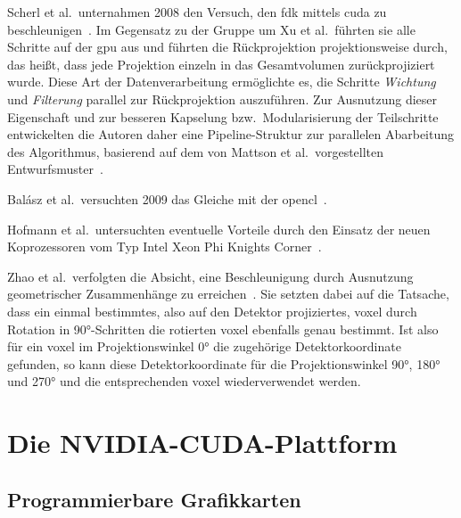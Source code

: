Scherl et al.\ unternahmen 2008 den Versuch, den \gls{fdk} mittels \gls{cuda} zu beschleunigen~\cite{scherlkeck}. Im
Gegensatz zu der Gruppe um Xu et al.\ führten sie alle Schritte auf der \gls{gpu} aus und führten die Rückprojektion
projektionsweise durch, das heißt, dass jede Projektion einzeln in das Gesamtvolumen zurückprojiziert wurde. Diese Art
der Datenverarbeitung ermöglichte es, die Schritte \textit{Wichtung} und \textit{Filterung} parallel zur Rückprojektion
auszuführen. Zur Ausnutzung dieser Eigenschaft und zur besseren Kapselung bzw.\ Modularisierung der Teilschritte
entwickelten die Autoren daher eine Pipeline-Struktur zur parallelen Abarbeitung des Algorithmus, basierend auf dem von
Mattson et al.\ vorgestellten Entwurfsmuster~\cite{mattsan}.

Balász et al.\ versuchten 2009 das Gleiche mit der \gls{opencl}~\cite{balgab}.

Hofmann et al.\ untersuchten eventuelle Vorteile durch den Einsatz der neuen Koprozessoren vom Typ 
Intel{\textregistered} Xeon Phi{\texttrademark} {\glq}Knights Corner{\grq}~\cite{hoftrei}.

Zhao et al.\ verfolgten die Absicht, eine Beschleunigung durch Ausnutzung geometrischer Zusammenhänge zu
erreichen~\cite{zhao}. Sie setzten dabei auf die Tatsache, dass ein einmal bestimmtes, also auf den Detektor
projiziertes, \gls{voxel} durch Rotation in 90°-Schritten die rotierten \gls{voxel} ebenfalls genau bestimmt. Ist also
für ein \gls{voxel} im Projektionswinkel 0° die zugehörige Detektorkoordinate gefunden, so kann diese Detektorkoordinate
für die Projektionswinkel 90°, 180° und 270° und die entsprechenden \gls{voxel} wiederverwendet werden.

\section{Die NVIDIA{\textregistered}-CUDA{\textregistered}-Plattform}

\subsection{Programmierbare Grafikkarten}

